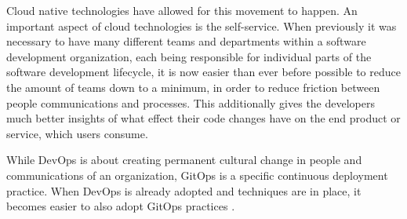 Cloud native technologies have allowed for this movement to happen.
An important aspect of cloud technologies is the self-service.
When previously it was necessary to have many different teams and departments
within a software development organization,
each being responsible for individual parts of the 
software development lifecycle,
it is now easier than ever before possible to reduce the amount of
teams down to a minimum, in order to reduce friction between people communications and processes.
This additionally gives the developers much better insights of what effect their code changes have
on the end product or service, which users consume.

While DevOps is about creating permanent cultural change in people
and communications of an organization,
GitOps is a specific continuous deployment practice.
When DevOps is already adopted and techniques are in place,
it becomes easier to also adopt GitOps practices
\autocite{gitopsCloudnativeCDInnoq}.






